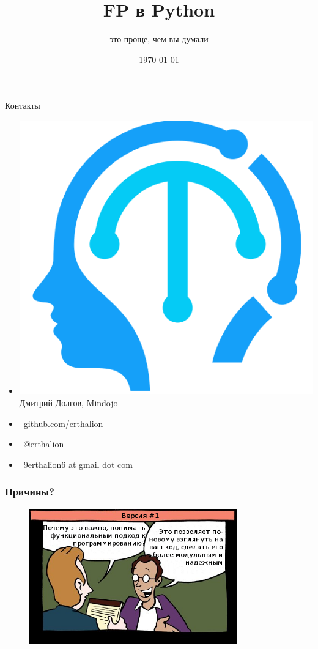 \documentclass[18pt, compress, aspectratio=169]{beamer}
\title{FP в Python}
\subtitle{это проще, чем вы думали}
\date{\today}
\institute{}
\def\twitter{{\FA \faTwitter}}
\def\github{{\FA \faGithubSign}}
\def\email{{\FA \faEnvelope}}
\begin{document}
\fontsize{19pt}{20}\selectfont
\maketitle

\section{}

\begin{frame}{Контакты}
    \begin{itemize}[label={}]
        \item \includegraphics[scale=0.04]{mindojo_logo.png} Дмитрий Долгов, Mindojo
        \item {\github\ github.com/erthalion}
        \item {\twitter\ @erthalion}
        \item \email\ 9erthalion6 at gmail dot com
    \end{itemize}
\end{frame}

\begin{frame}
    \frametitle{Причины?}
    \vspace{-25pt}
    \begin{figure}
        \includegraphics[width=0.8\textwidth,center]{first_option.png}
    \end{figure}
\end{frame}
\end{document}
